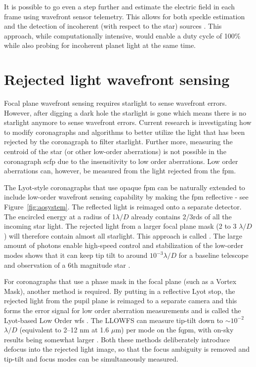 \documentclass[letterpaper]{ar-1col}
\newcommand{\mum}{$\mu$m}
\newcommand{\ld}{$\lambda/D$}
\begin{document}
It is possible to go even a step further and estimate the electric field in each frame using wavefront sensor telemetry.
%
This allows for both speckle estimation and the detection of incoherent (with respect to the star) sources \citep{rodack2021millisecond, frazin2021millisecond}. 
%
This approach, while computationally intensive, would enable a duty cycle of 100\% while also probing for incoherent planet light at the same time.

\section{Rejected light wavefront sensing}

Focal plane wavefront sensing requires starlight to sense wavefront errors.
%
However, after digging a dark hole the starlight is gone which means there is no starlight anymore to sense wavefront errors.
%
Current research is investigating how to modify coronagraphs and algorithms to better utilize the light that has been rejected by the coronagraph to filter starlight.
%
Further more, measuring the centroid of the star (or other low-order aberrations) is not possible in the coronagraph \ac{scfp} due to the insensitivity to low order aberrations.
%
Low order aberrations can, however, be measured from the light rejected from the \ac{fpm}.

The Lyot-style coronagraphs that use opaque \ac{fpm} can be naturally extended to include low-order wavefront sensing capability by making the \ac{fpm} reflective - see Figure~\ref{fig:aosystem}.
%
The reflected light is reimaged onto a separate detector.
%
The encircled energy at a radius of 1$\lambda/D$ already contains 2/3rds of all the incoming star light.
%
The rejected light from a larger focal plane mask (2 to 3 \ld{}) will therefore contain almost all starlight.
%
This approach is called \citep[Coronagraphic low order \ac{wfs}; CLOWFS - ][]{Guyon09}.
%
The large amount of photons enable high-speed control and stabilization of the low-order modes shows that it can keep tip tilt to around $10^{-3}$\ld{} for a baseline telescope and observation of a 6th magnitude star \citep{Guyon09}.

For coronagraphs that use a phase mask in the focal plane (such as a Vortex Mask), another method is required.
%
By putting in a reflective Lyot stop, the rejected light from the pupil plane is reimaged to a separate camera and this forms the error signal for low order aberration measurements and is called the Lyot-based Low Order \ac{wfs} \citep[LLOWFS; ][]{Singh14,Singh15}.
%
The LLOWFS can measure tip-tilt down to $\sim 10^{-2}$\ld{} (equivalent to 2–12 nm at 1.6 \mum{}) per mode on the \ac{fqpm}, with on-sky results being somewhat larger \citep{Singh15}.
%
Both these methods deliberately introduce defocus into the rejected light image, so that the focus ambiguity is removed and tip-tilt and focus modes can be simultaneously measured.
\end{document}
